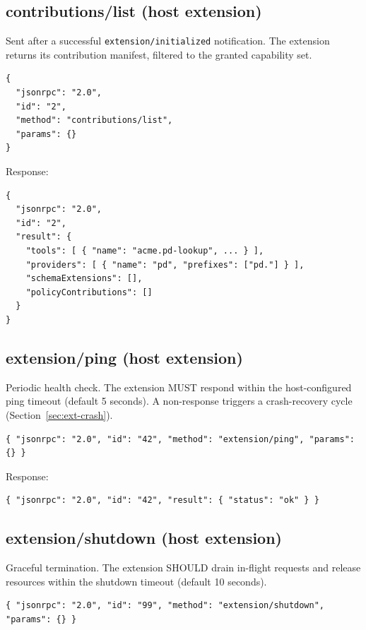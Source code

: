 \subsection{contributions/list (host \textrightarrow{} extension)}

Sent after a successful \texttt{extension/initialized} notification.  The
extension returns its contribution manifest, filtered to the granted capability
set.

\begin{verbatim}
{
  "jsonrpc": "2.0",
  "id": "2",
  "method": "contributions/list",
  "params": {}
}
\end{verbatim}

Response:

\begin{verbatim}
{
  "jsonrpc": "2.0",
  "id": "2",
  "result": {
    "tools": [ { "name": "acme.pd-lookup", ... } ],
    "providers": [ { "name": "pd", "prefixes": ["pd."] } ],
    "schemaExtensions": [],
    "policyContributions": []
  }
}
\end{verbatim}

\subsection{extension/ping (host \textrightarrow{} extension)}

Periodic health check.  The extension MUST respond within the host-configured
ping timeout (default 5 seconds).  A non-response triggers a crash-recovery
cycle (Section~\ref{sec:ext-crash}).

\begin{verbatim}
{ "jsonrpc": "2.0", "id": "42", "method": "extension/ping", "params": {} }
\end{verbatim}

Response:

\begin{verbatim}
{ "jsonrpc": "2.0", "id": "42", "result": { "status": "ok" } }
\end{verbatim}

\subsection{extension/shutdown (host \textrightarrow{} extension)}

Graceful termination.  The extension SHOULD drain in-flight requests and
release resources within the shutdown timeout (default 10 seconds).

\begin{verbatim}
{ "jsonrpc": "2.0", "id": "99", "method": "extension/shutdown", "params": {} }
\end{verbatim}

